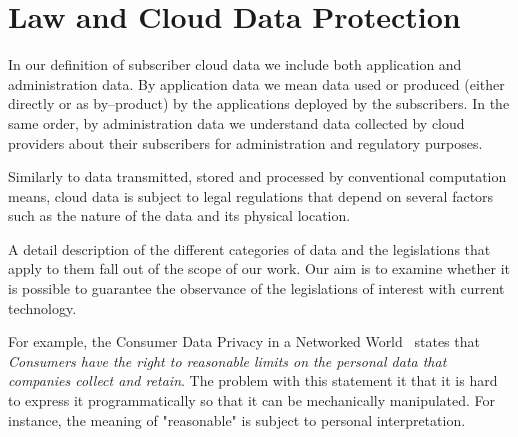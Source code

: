 \documentclass[runningheads,a4paper]{llncs}
\begin{document}
\section{Law and Cloud Data Protection}
In our definition of subscriber cloud data we include 
both application and administration data. By application data
we mean data used or produced (either directly or as
by--product) by the applications deployed
by the subscribers. In the same order, by administration data
we understand data collected by cloud providers about their
subscribers for administration and regulatory purposes.

Similarly to data transmitted, stored and processed by
conventional computation means, cloud data is subject
to legal regulations  that depend on several factors
such as the nature of the data and its physical location.

A detail description of the different categories of data and
the legislations that apply to them fall out of the scope
of our work. Our aim is to examine whether  it is 
possible to guarantee the observance of the legislations
of interest with current technology.  


For example, the Consumer Data Privacy in a Networked World~\cite{CDP2012}
states that \emph{Consumers have the right to reasonable limits on the 
personal data that companies collect and retain}. The problem with
this statement it that it is hard to express it programmatically so that
it can be mechanically manipulated. For instance, the meaning of
"reasonable" is subject to personal interpretation. 

\end{document}
